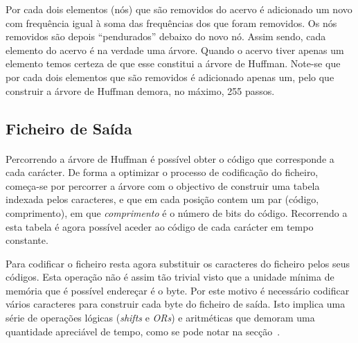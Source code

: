 Por cada dois elementos (nós) que são removidos do acervo é adicionado um novo com frequência igual à soma das frequências dos que foram removidos. Os nós removidos são depois ``pendurados'' debaixo do novo nó. Assim sendo, cada elemento do acervo é na verdade uma árvore. Quando o acervo tiver apenas um elemento temos certeza de que esse constitui a árvore de Huffman. Note-se que por cada dois elementos que são removidos é adicionado apenas um, pelo que construir a árvore de Huffman demora, no máximo, 255 passos.

\subsection{Ficheiro de Saída}

\paragraph{} Percorrendo a árvore de Huffman é possível obter o código que corresponde a cada carácter. De forma a optimizar o processo de codificação do ficheiro, começa-se por percorrer a árvore com o objectivo de construir uma tabela indexada pelos caracteres, e que em cada posição contem um par (código, comprimento), em que \emph{comprimento} é o número de bits do código. Recorrendo a esta tabela é agora possível aceder ao código de cada carácter em tempo constante.

Para codificar o ficheiro resta agora substituir os caracteres do ficheiro pelos seus códigos. Esta operação não é assim tão trivial visto que a unidade mínima de memória que é possível endereçar é o byte. Por este motivo é necessário codificar vários caracteres para construir cada byte do ficheiro de saída. Isto implica uma série de operações lógicas (\textit{shifts} e \textit{ORs}) e aritméticas que demoram uma quantidade apreciável de tempo, como se pode notar na secção~.
